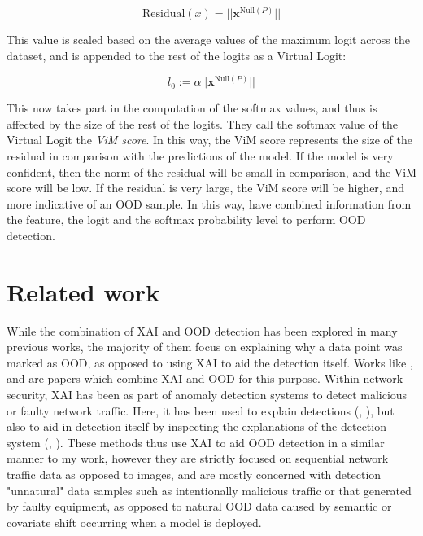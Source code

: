 \documentclass[UKenglish]{uiomasterthesis} %
\theoremstyle{definition}
\begin{document}
\begin{equation}
\text{Residual}(x) = || \bm{x}^{\text{Null}(P)}||
\label{virtuallogit}
\end{equation}

This value is scaled based on the average values of the maximum logit across the dataset, and is appended to the rest of the logits as a Virtual Logit:

\begin{equation}
l_0 := \alpha || \bm{x}^{\text{Null}(P)}||
\label{virtuallogit}
\end{equation}

This now takes part in the computation of the softmax values, and thus is affected by the size of the rest of the logits. They call the softmax value of the Virtual Logit the {\it ViM score}. In this way, the ViM score represents the size of the residual in comparison with the predictions of the model. If the model is very confident, then the norm of the residual will be small in comparison, and the ViM score will be low. If the residual is very large, the ViM score will be higher, and more indicative of an OOD sample. In this way, \cite{vim} have combined information from the feature, the logit and the softmax probability level to perform OOD detection.

\section{Related work} \label{section:relatedwork}

While the combination of XAI and OOD detection has been explored in many previous works, the majority of them focus on explaining why a data point was marked as OOD, as opposed to using XAI to aid the detection itself. Works like \cite{uncertainty}, \cite{generalxaiforood} and \cite{tallon2020explainable} are papers which combine XAI and OOD for this purpose. Within network security, XAI has been as part of anomaly detection systems to detect malicious or faulty network traffic. Here, it has been used to explain detections (\cite{idsxai}, \cite{mahbooba}), but also to aid in detection itself by inspecting the explanations of the detection system (\cite{tcydenova2021detection}, \cite{dnsxai}). These methods thus use XAI to aid OOD detection in a similar manner to my work, however they are strictly focused on sequential network traffic data as opposed to images, and are mostly concerned with detection "unnatural" data samples such as intentionally malicious traffic or that generated by faulty equipment, as opposed to natural OOD data caused by semantic or covariate shift occurring when a model is deployed.
\end{document}
